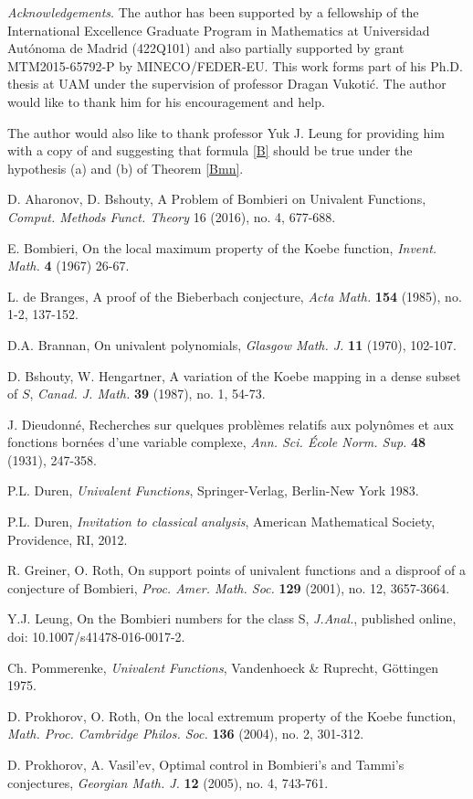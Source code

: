 \documentclass[11pt,reqno]{amsart}
\theoremstyle{plain}
\theoremstyle{definition}
\theoremstyle{remark}
\begin{document}
\vspace{0,2cm}
\emph{Acknowledgements}. The author has been supported by a fellowship of the International Excellence Graduate Program in Mathematics at Universidad Aut\'onoma de Madrid (422Q101) and also partially supported by grant MTM2015-65792-P by MINECO/FEDER-EU. This work forms part of his Ph.D. thesis at UAM under the supervision of professor Dragan Vukoti\'c. The author would like to thank him for his encouragement and help. 

The author would also like to thank professor Yuk J. Leung for providing him with a copy of \cite{Le} and suggesting that formula \eqref{B} should be true under the hypothesis (a) and (b) of Theorem \ref{Bmn}.

\begin{thebibliography}{99}
 D. Aharonov, D. Bshouty, A Problem of Bombieri on Univalent Functions, \emph{Comput. Methods Funct. Theory} 16 (2016), no. 4, 677-688.

 E. Bombieri, On the local maximum property of the Koebe function, \emph{Invent. Math.}  \textbf{4} (1967) 26-67.

 L. de Branges, A proof of the Bieberbach conjecture, \textit{Acta Math.} \textbf{154} (1985), no. 1-2, 137-152.

 D.A. Brannan, On univalent polynomials, \emph{Glasgow Math. J.} \textbf{11} (1970), 102-107. 

 D. Bshouty, W. Hengartner, A variation of the Koebe mapping in a dense subset of $S$, \emph{Canad. J. Math.} \textbf{39} (1987), no. 1, 54-73. 

 J. Dieudonn\'e, Recherches sur quelques probl\`emes relatifs aux polyn\^omes et aux fonctions born\'ees d'une variable complexe, \emph{Ann. Sci. \'Ecole Norm. Sup.} \textbf{48} (1931), 247-358. 

 P.L. Duren, \emph{Univalent Functions}, Springer-Verlag, Berlin-New York 1983.

 P.L. Duren, \emph{Invitation to classical analysis}, American Mathematical Society, Providence, RI, 2012.

 R. Greiner, O. Roth, On support points of univalent functions and a disproof of a conjecture of Bombieri, \emph{Proc. Amer. Math. Soc.} \textbf{129} (2001), no. 12, 3657-3664.

 Y.J. Leung, On the Bombieri numbers for the class S, \emph{J.Anal.}, published online, doi: 10.1007/s41478-016-0017-2.

 Ch. Pommerenke, \emph{Univalent Functions}, Vandenhoeck \& Ruprecht, G\"ottingen 1975.

 D. Prokhorov, O. Roth, On the local extremum property of the Koebe function, \emph{Math. Proc. Cambridge Philos. Soc.} \textbf{136} (2004), no. 2, 301-312.

 D. Prokhorov, A. Vasil'ev, Optimal control in Bombieri's and Tammi's conjectures, \emph{Georgian Math. J.} \textbf{12} (2005), no. 4, 743-761. 
\end{thebibliography}
\end{document}
